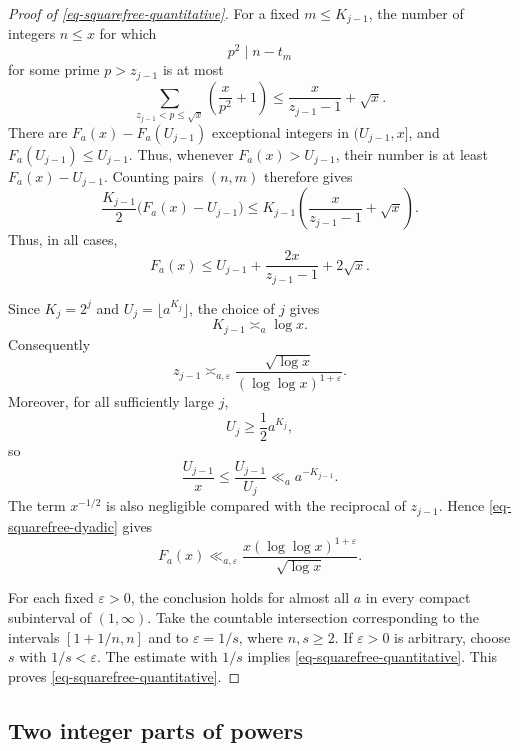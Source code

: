 \documentclass[11pt,reqno]{amsart}
\numberwithin{equation}{section}
\begin{document}
\begin{proof}[Proof of \eqref{eq-squarefree-quantitative}]
        For a fixed $m\le K_{j-1}$, the number of integers $n\le x$ for which
        $$
        p^2\mid n-t_m
        $$
        for some prime $p>z_{j-1}$ is at most
        $$
        \sum_{z_{j-1}<p\le\sqrt{x}}
        \left(\frac{x}{p^2}+1\right)
        \le
        \frac{x}{z_{j-1}-1}+\sqrt{x}.
        $$
        There are $F_a(x)-F_a(U_{j-1})$ exceptional integers in $(U_{j-1},x]$, and $F_a(U_{j-1})\le U_{j-1}$. Thus, whenever $F_a(x)>U_{j-1}$, their number is at least $F_a(x)-U_{j-1}$. Counting pairs $(n,m)$ therefore gives
        $$
        \frac{K_{j-1}}2
        \bigl(F_a(x)-U_{j-1}\bigr)
        \le
        K_{j-1}
        \left(\frac{x}{z_{j-1}-1}+\sqrt{x}\right).
        $$
        Thus, in all cases,
        \begin{equation}\label{eq-squarefree-dyadic}
            F_a(x)
            \le
            U_{j-1}
            +\frac{2x}{z_{j-1}-1}
            +2\sqrt{x}.
        \end{equation}

        Since $K_j=2^j$ and $U_j=\lfloor a^{K_j}\rfloor$, the choice of $j$ gives
        $$
        K_{j-1}\asymp_a\log x.
        $$
        Consequently
        $$
        z_{j-1}
        \asymp_{a,\varepsilon}
        \frac{\sqrt{\log x}}{(\log\log x)^{1+\varepsilon}}.
        $$
        Moreover, for all sufficiently large $j$,
        $$
        U_j\ge \frac12a^{K_j},
        $$
        so
        $$
        \frac{U_{j-1}}x
        \le \frac{U_{j-1}}{U_j}
        \ll_a a^{-K_{j-1}}.
        $$
        The term $x^{-1/2}$ is also negligible compared with the reciprocal of $z_{j-1}$. Hence \eqref{eq-squarefree-dyadic} gives
        $$
        F_a(x)
        \ll_{a,\varepsilon}
        \frac{x(\log\log x)^{1+\varepsilon}}{\sqrt{\log x}}.
        $$

        For each fixed $\varepsilon>0$, the conclusion holds for almost all $a$ in every compact subinterval of $(1,\infty)$. Take the countable intersection corresponding to the intervals $[1+1/n,n]$ and to $\varepsilon=1/s$, where $n,s\ge2$. If $\varepsilon>0$ is arbitrary, choose $s$ with $1/s<\varepsilon$. The estimate with $1/s$ implies \eqref{eq-squarefree-quantitative}. This proves \eqref{eq-squarefree-quantitative}.
    \end{proof}


    \subsection{Two integer parts of powers}
\end{document}
